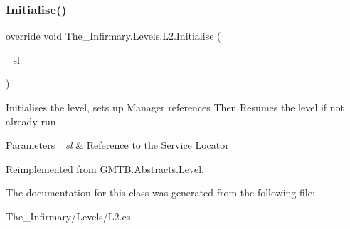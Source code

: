 \subsubsection{\texorpdfstring{Initialise()}{Initialise()}}
{\footnotesize\ttfamily override void The\+\_\+\+Infirmary.\+Levels.\+L2.\+Initialise (\begin{DoxyParamCaption}\item[{\mbox{\hyperlink{interface_g_m_t_b_1_1_interfaces_1_1_i_service_locator}{I\+Service\+Locator}}}]{\+\_\+sl }\end{DoxyParamCaption})\hspace{0.3cm}{\ttfamily [virtual]}}



Initialises the level, sets up Manager references Then Resumes the level if not already run 


\begin{DoxyParams}{Parameters}
{\em \+\_\+sl} & Reference to the Service Locator \\
\hline
\end{DoxyParams}


Reimplemented from \mbox{\hyperlink{class_g_m_t_b_1_1_abstracts_1_1_level_a0048401bb0fb66b0fb0c19b3b25e4265}{G\+M\+T\+B.\+Abstracts.\+Level}}.



The documentation for this class was generated from the following file\+:\begin{DoxyCompactItemize}
\item 
The\+\_\+\+Infirmary/\+Levels/L2.\+cs\end{DoxyCompactItemize}
